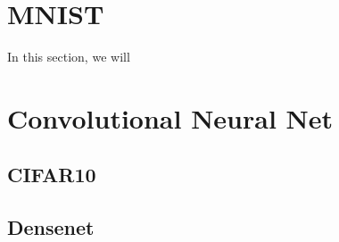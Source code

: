 \section{MNIST}
In this section, we will 

\section{Convolutional Neural Net}

\subsection{CIFAR10}

\subsection{Densenet}


